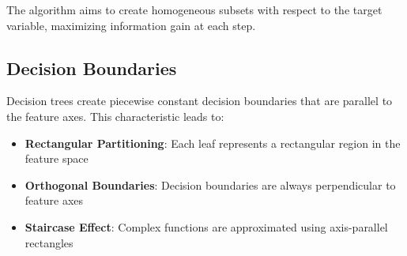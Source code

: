 \documentclass[
  letterpaper,
  DIV=11,
  numbers=noendperiod]{scrreprt}
\providecommand{\tightlist}{%
  \setlength{\itemsep}{0pt}\setlength{\parskip}{0pt}}\usepackage{longtable,booktabs,array}
\begin{document}
The algorithm aims to create homogeneous subsets with respect to the
target variable, maximizing information gain at each step.

\subsection{Decision Boundaries}\label{decision-boundaries}

Decision trees create piecewise constant decision boundaries that are
parallel to the feature axes. This characteristic leads to:

\begin{itemize}
\tightlist
\item
  \textbf{Rectangular Partitioning}: Each leaf represents a rectangular
  region in the feature space
\item
  \textbf{Orthogonal Boundaries}: Decision boundaries are always
  perpendicular to feature axes
\item
  \textbf{Staircase Effect}: Complex functions are approximated using
  axis-parallel rectangles
\end{itemize}
\end{document}
